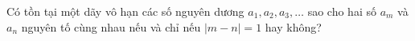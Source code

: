 \ifshowproblem
\begin{problem}\label{example:RMM-2015-P1}
    Có tồn tại một dãy vô hạn các số nguyên dương \( a_1, a_2, a_3, \ldots \)
    sao cho hai số \( a_m \) và \( a_n \) nguyên tố cùng nhau nếu và chỉ nếu \( |m - n| = 1 \) hay không?
\end{problem}
\fi

\fi
